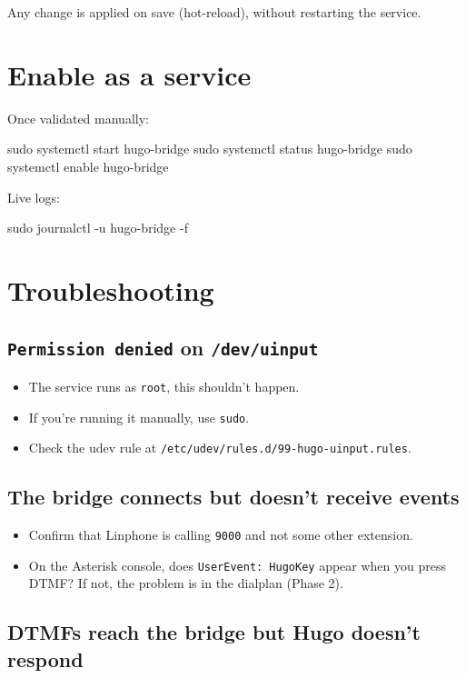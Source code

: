 Any change is applied on save (hot-reload), without restarting the service.

\section{Enable as a service}

Once validated manually:

\begin{shellcode}
sudo systemctl start hugo-bridge
sudo systemctl status hugo-bridge
sudo systemctl enable hugo-bridge
\end{shellcode}

Live logs:

\begin{shellcode}
sudo journalctl -u hugo-bridge -f
\end{shellcode}

\section{Troubleshooting}

\subsection{\texttt{Permission denied} on \texttt{/dev/uinput}}

\begin{itemize}
  \item The service runs as \texttt{root}, this shouldn't happen.
  \item If you're running it manually, use \texttt{sudo}.
  \item Check the udev rule at \texttt{/etc/udev/rules.d/99-hugo-uinput.rules}.
\end{itemize}

\subsection{The bridge connects but doesn't receive events}

\begin{itemize}
  \item Confirm that Linphone is calling \texttt{9000} and not some other extension.
  \item On the Asterisk console, does \texttt{UserEvent: HugoKey} appear when you press DTMF? If not, the problem is in the dialplan (Phase 2).
\end{itemize}

\subsection{DTMFs reach the bridge but Hugo doesn't respond}

